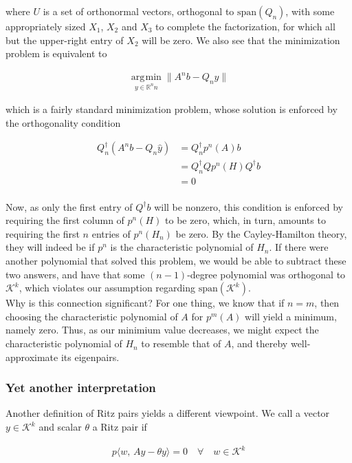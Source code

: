 \documentclass[11pt]{article}
\newcommand{\K}[1]{\mathcal{K}^{#1}}
\newcommand{\Rn}{\mathbb{R}^{n}}
\DeclareMathOperator*{\argmin}{\arg\!\min}
\begin{document}
where $U$ is a set of orthonormal vectors, orthogonal to $\textrm{span}(Q_n)$, with some appropriately sized $X_1$, $X_2$ and $X_3$ to complete the factorization, for which all but the upper-right entry of $X_2$ will be zero. We also see that the minimization problem is equivalent to 

\begin{align*}
  \argmin \limits_{y \in \Rn{n}} \| A^nb - Q_n y \|
\end{align*}

which is a fairly standard minimization problem, whose solution is enforced by the orthogonality condition

\begin{align*}
  Q_n^\dagger(A^nb - Q_n\hat{y}) &= Q_n^\dagger p^n(A)b \\
  &= Q_n^\dagger Qp^n(H)Q^\dagger b \\
  &= 0 \\
\end{align*}

Now, as only the first entry of $Q^\dagger b$ will be nonzero, this condition is enforced by requiring the first column of $p^n(H)$ to be zero, which, in turn, amounts to requiring the first $n$ entries of $p^n(H_n)$ be zero. By the Cayley-Hamilton theory, they will indeed be if $p^n$ is the characteristic polynomial of $H_n$. If there were another polynomial that solved this problem, we would be able to subtract these two answers, and have that some $(n-1)$-degree polynomial was orthogonal to $\K{k}$, which violates our assumption regarding $\textrm{span}(\K{k})$. \\

Why is this connection significant? For one thing, we know that if $n = m$, then choosing the characteristic polynomial of $A$ for $p^m(A)$ will yield a minimum, namely zero. Thus, as our minimium value decreases, we might expect the characteristic polynomial of $H_n$ to resemble that of $A$, and thereby well-approximate its eigenpairs. \\

\subsubsection{Yet another interpretation}

Another definition of Ritz pairs yields a different viewpoint. We call a vector $y \in \K{k}$ and scalar $\theta$ a Ritz pair if

\begin{align*}p
  \langle w, \, Ay - \theta y \rangle = 0 \quad \forall \quad w \in \K{k}
\end{align*}
\end{document}
